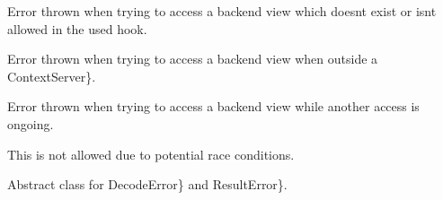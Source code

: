 \documentclass[letterpaper,10pt,italian]{sphinxmanual}
\begin{document}

\begin{fulllineitems}
\label{\detokenize{code/frontend/index:ViewNotAllowedError}}
\sphinxAtStartPar
Error thrown when trying to access a backend view which doesn\textquotesingle{}t exist or isn\textquotesingle{}t allowed in the used hook.

\end{fulllineitems}


\begin{fulllineitems}
\label{\detokenize{code/frontend/index:ServerNotConfiguredError}}
\sphinxAtStartPar
Error thrown when trying to access a backend view when outside a  ContextServer\}.

\end{fulllineitems}


\begin{fulllineitems}
\label{\detokenize{code/frontend/index:FetchAlreadyRunningError}}
\sphinxAtStartPar
Error thrown when trying to access a backend view while another access is ongoing.

\sphinxAtStartPar
This is not allowed due to potential race conditions.

\end{fulllineitems}


\begin{fulllineitems}
\label{\detokenize{code/frontend/index:FetchError}}
\sphinxAtStartPar
Abstract class for  DecodeError\} and  ResultError\}.

\end{fulllineitems}
\end{document}
